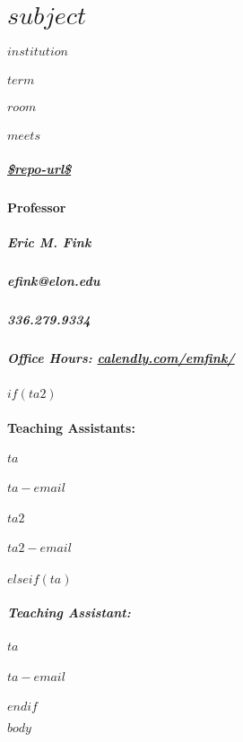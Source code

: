 \documentclass[11pt,letterpaper,twoside]{article}
\begin{document}
\thispagestyle{empty}

\color{OffBlack}


\section{$subject$}

\begin{footnotesize}
\subparagraph{$institution$}
\subparagraph{$term$}
\subparagraph{$room$}
\subparagraph{$meets$}
\subparagraph{\url{$repo-url$}}
\vspace{1em}

\paragraph{Professor}
\subparagraph{Eric M. Fink} 
\subparagraph{efink@elon.edu}
\subparagraph{336.279.9334} 
\subparagraph{Office Hours: {\url{calendly.com/emfink/}}}

\vspace{1em}

$if(ta2)$
\paragraph{Teaching Assistants:}
\subparagraph{$ta$}
\subparagraph{$ta-email$}
\vspace{.5em}
\subparagraph{$ta2$}
\subparagraph{$ta2-email$}
$elseif(ta)$
\subparagraph{Teaching Assistant:}
\subparagraph{$ta$}
\subparagraph{$ta-email$}
$endif$
\end{footnotesize}

\vspace{1em}


$body$
\end{document}
